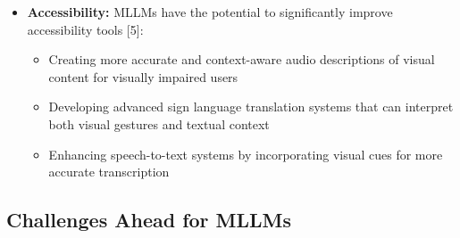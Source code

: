 \begin{itemize}
    \item \textbf{Accessibility:} MLLMs have the potential to significantly improve accessibility tools [5]:
    \begin{itemize}
        \item Creating more accurate and context-aware audio descriptions of visual content for visually impaired users
        \item Developing advanced sign language translation systems that can interpret both visual gestures and textual context
        \item Enhancing speech-to-text systems by incorporating visual cues for more accurate transcription
    \end{itemize}
\end{itemize}

\subsection{Challenges Ahead for MLLMs}

